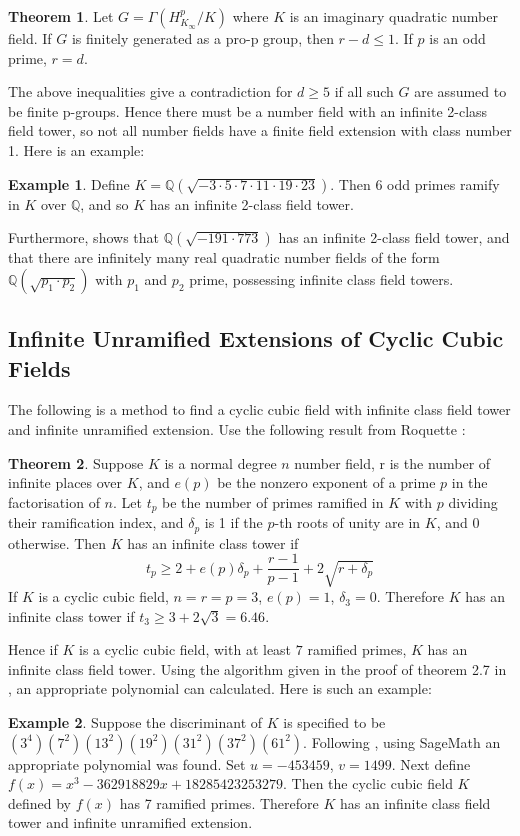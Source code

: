 \documentclass[12pt]{extarticle}
\newcommand{\Q}{\mathbb{Q}}
\newcommand{\<}{\langle}
\renewcommand{\>}{\rangle}
\theoremstyle{definition}
\newtheorem{theorem}{Theorem}
\newtheorem*{example}{Example}
\begin{document}
\begin{theorem}
    Let $G = \Gamma(H_{K_{\infty}}^{p}/K)$ where $K$ is an imaginary quadratic number field. If $G$ is finitely generated as a pro-p group, then
$r-d\leq 1 $. If $p$ is an odd prime, $r=d$.
\end{theorem}
The above inequalities give a contradiction for $d \geq 5$ if all such $G$ are assumed to be finite p-groups. Hence there must be a number field with an infinite 2-class field tower, so not all number fields have a finite field extension with class number 1. Here is an example:
\begin{example}
    Define $K=\Q(\sqrt{-3 \cdot 5\cdot7\cdot11\cdot19\cdot23})$. Then 6 odd primes ramify in $K$ over $\Q$, and so $K$ has an infinite 2-class field tower. 
\end{example}
Furthermore, \cite{SCHO} shows that $\Q(\sqrt{-191\cdot773})$ has an infinite 2-class field tower, and that there are infinitely many real quadratic number fields of the form $\Q(\sqrt{p_1 \cdot p_2})$ with $p_1$ and $p_2$ prime, possessing infinite class field towers. 

\subsection{Infinite Unramified Extensions of Cyclic Cubic Fields }
The following is a method to find a cyclic cubic field with infinite class field tower and infinite unramified extension. Use the following result from Roquette \cite{KOCH}:
\begin{theorem}
    Suppose $K$ is a normal degree $n$ number field, r is the number of infinite places over $K$, and $e(p)$ be the nonzero exponent of a prime $p$ in the factorisation of $n$. Let $t_p$ be the number of primes ramified in $K$ with $p$ dividing their ramification index, and $\delta_p$ is 1 if the $p$-th roots of unity are in $K$, and 0 otherwise. Then $K$ has an infinite class tower if \begin{equation}
        t_p\geqslant 2 + e(p)\delta_p + \frac{r-1}{p-1} + 2 \sqrt{r+\delta_p} 
    \end{equation}
 If $K$ is a cyclic cubic field,  $n=r=p=3$, $e(p)=1$, $\delta_3 = 0$. Therefore $K$ has an infinite class tower if $t_3 \geq 3 + 2\sqrt{3} = 6.46$. 
\end{theorem}
Hence if $K$ is a cyclic cubic field, with at least $7$ ramified primes, $K$ has an infinite class field tower. Using the algorithm given in the proof of theorem 2.7 in \cite{WONG}, an appropriate polynomial can calculated. Here is such an example:
\begin{example}
    Suppose the discriminant of $K$ is specified to be $(3^4)(7^2)(13^2)(19^2)(31^2)(37^2)(61^2)$. Following \cite{WONG}, using SageMath an appropriate polynomial was found. Set $u = -453459$, $v=1499$.  Next define $f(x) = x^3-362918829x + 18285423253279$. Then the cyclic cubic field $K$ defined by $f(x)$ has 7 ramified primes. Therefore $K$ has an infinite class field tower and infinite unramified extension. 
\end{example}
\end{document}
